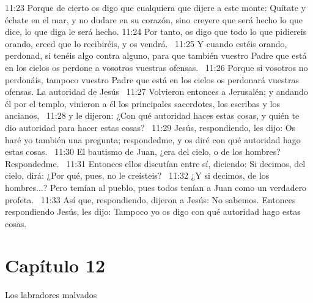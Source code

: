 11:23 Porque de cierto os digo que cualquiera que dijere a este monte: Quítate y échate en el mar, y no dudare en su corazón, sino creyere que será hecho lo que dice, lo que diga le será hecho. 
11:24 Por tanto, os digo que todo lo que pidiereis orando, creed que lo recibiréis, y os vendrá.  
11:25 Y cuando estéis orando, perdonad, si tenéis algo contra alguno, para que también vuestro Padre que está en los cielos os perdone a vosotros vuestras ofensas.  
11:26 Porque si vosotros no perdonáis, tampoco vuestro Padre que está en los cielos os perdonará vuestras ofensas. 
La autoridad de Jesús   
11:27 Volvieron entonces a Jerusalén; y andando él por el templo, vinieron a él los principales sacerdotes, los escribas y los ancianos,  
11:28 y le dijeron: ¿Con qué autoridad haces estas cosas, y quién te dio autoridad para hacer estas cosas?  
11:29 Jesús, respondiendo, les dijo: Os haré yo también una pregunta; respondedme, y os diré con qué autoridad hago estas cosas.  
11:30 El bautismo de Juan, ¿era del cielo, o de los hombres? Respondedme.  
11:31 Entonces ellos discutían entre sí, diciendo: Si decimos, del cielo, dirá: ¿Por qué, pues, no le creísteis?  
11:32 ¿Y si decimos, de los hombres...? Pero temían al pueblo, pues todos tenían a Juan como un verdadero profeta.  
11:33 Así que, respondiendo, dijeron a Jesús: No sabemos. Entonces respondiendo Jesús, les dijo: Tampoco yo os digo con qué autoridad hago estas cosas. 
\section*{Capítulo 12}
Los labradores malvados   

